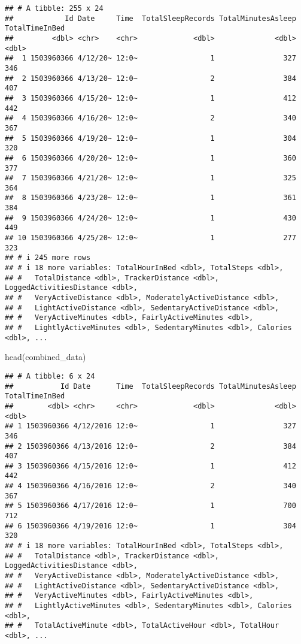 \documentclass[
]{article}
\newenvironment{Shaded}{\begin{snugshade}}{\end{snugshade}}
\newcommand{\FunctionTok}[1]{\textcolor[rgb]{0.00,0.00,0.00}{#1}}
\newcommand{\NormalTok}[1]{#1}
\begin{document}
\begin{verbatim}
## # A tibble: 255 x 24
##            Id Date     Time  TotalSleepRecords TotalMinutesAsleep TotalTimeInBed
##         <dbl> <chr>    <chr>             <dbl>              <dbl>          <dbl>
##  1 1503960366 4/12/20~ 12:0~                 1                327            346
##  2 1503960366 4/13/20~ 12:0~                 2                384            407
##  3 1503960366 4/15/20~ 12:0~                 1                412            442
##  4 1503960366 4/16/20~ 12:0~                 2                340            367
##  5 1503960366 4/19/20~ 12:0~                 1                304            320
##  6 1503960366 4/20/20~ 12:0~                 1                360            377
##  7 1503960366 4/21/20~ 12:0~                 1                325            364
##  8 1503960366 4/23/20~ 12:0~                 1                361            384
##  9 1503960366 4/24/20~ 12:0~                 1                430            449
## 10 1503960366 4/25/20~ 12:0~                 1                277            323
## # i 245 more rows
## # i 18 more variables: TotalHourInBed <dbl>, TotalSteps <dbl>,
## #   TotalDistance <dbl>, TrackerDistance <dbl>, LoggedActivitiesDistance <dbl>,
## #   VeryActiveDistance <dbl>, ModeratelyActiveDistance <dbl>,
## #   LightActiveDistance <dbl>, SedentaryActiveDistance <dbl>,
## #   VeryActiveMinutes <dbl>, FairlyActiveMinutes <dbl>,
## #   LightlyActiveMinutes <dbl>, SedentaryMinutes <dbl>, Calories <dbl>, ...
\end{verbatim}

\begin{Shaded}
\begin{Highlighting}[]
\FunctionTok{head}\NormalTok{(combined\_data)}
\end{Highlighting}
\end{Shaded}

\begin{verbatim}
## # A tibble: 6 x 24
##           Id Date      Time  TotalSleepRecords TotalMinutesAsleep TotalTimeInBed
##        <dbl> <chr>     <chr>             <dbl>              <dbl>          <dbl>
## 1 1503960366 4/12/2016 12:0~                 1                327            346
## 2 1503960366 4/13/2016 12:0~                 2                384            407
## 3 1503960366 4/15/2016 12:0~                 1                412            442
## 4 1503960366 4/16/2016 12:0~                 2                340            367
## 5 1503960366 4/17/2016 12:0~                 1                700            712
## 6 1503960366 4/19/2016 12:0~                 1                304            320
## # i 18 more variables: TotalHourInBed <dbl>, TotalSteps <dbl>,
## #   TotalDistance <dbl>, TrackerDistance <dbl>, LoggedActivitiesDistance <dbl>,
## #   VeryActiveDistance <dbl>, ModeratelyActiveDistance <dbl>,
## #   LightActiveDistance <dbl>, SedentaryActiveDistance <dbl>,
## #   VeryActiveMinutes <dbl>, FairlyActiveMinutes <dbl>,
## #   LightlyActiveMinutes <dbl>, SedentaryMinutes <dbl>, Calories <dbl>,
## #   TotalActiveMinute <dbl>, TotalActiveHour <dbl>, TotalHour <dbl>, ...
\end{verbatim}
\end{document}
